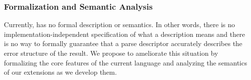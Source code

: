 \documentclass[11pt]{article}
\begin{document}
% 


\subsubsection{Formalization and Semantic Analysis}

Currently, \pads{} has no formal description or semantics. 
In other words, there is no implementation-independent specification
of what a \pads{} description means and there is no way to
formally guarantee that a parse descriptor accurately describes the
error structure of the result.
We propose to ameliorate this situation by
formalizing the core features of the current language
and analyzing the semantics of our extensions as we develop them.
\end{document}

